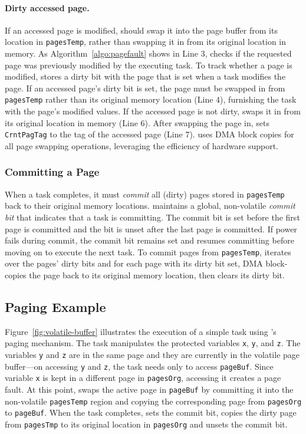 \paragraph{Dirty accessed page.} If an accessed page is modified, \sys should swap it into the page buffer from its location in {\tt pagesTemp}, rather than swapping it in from its original location in memory. As Algorithm~\ref{algo:pagefault} shows in Line 3, \sys checks if the requested page was previously modified by the executing task. To track whether a page is modified, \sys stores a dirty bit with the page that is set when a task modifies the page. If an accessed page's dirty bit is set, the page must be swapped in from \texttt{pagesTemp} rather than its original memory location (Line 4), furnishing the task with the page's modified values. If the accessed page is not dirty, \sys swaps it in from its original location in memory (Line 6). After swapping the page in, \sys sets \texttt{CrntPagTag} to the tag of the accessed page (Line 7). \sys uses DMA block copies for all page swapping operations, leveraging the efficiency of hardware support.

\subsubsection{Committing a Page}

When a task completes, it must {\em commit} all (dirty) pages stored in \texttt{pagesTemp} back to their original memory locations. \sys maintains a global, non-volatile {\em commit bit} that indicates that a task is committing. The commit bit is set before the first page is committed and the bit is unset after the last page is committed. If power fails during commit, the commit bit remains set and \sys resumes committing before moving on to execute the next task. To commit pages from {\tt pagesTemp}, \sys iterates over the pages' dirty bits and for each page with its dirty bit set, \sys DMA block-copies the page back to its
original memory location, then clears its dirty bit.

\subsection{Paging Example}

Figure~\ref{fig:volatile-buffer} illustrates the execution of a simple task using \sys's paging mechanism. The task manipulates the protected variables {\tt x}, {\tt y}, and {\tt z}. The variables {\tt y} and {\tt z} are in the same page and they are currently in the volatile page buffer---on accessing {\tt y} and {\tt z}, the task needs only to access \texttt{pageBuf}. Since variable \texttt{x} is kept in a different page in \texttt{pagesOrg}, accessing it creates a page fault. At this point, \sys swaps the active page in \texttt{pageBuf} by committing it into the non-volatile {\tt pagesTemp} region and copying the corresponding page from \texttt{pagesOrg} to \texttt{pageBuf}. When the task completes, \sys sets the commit bit, copies the dirty page from \texttt{pagesTmp} to its original location in \texttt{pagesOrg} and unsets the commit bit.

